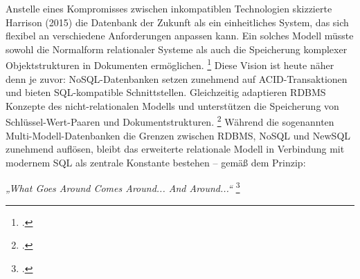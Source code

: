 Anstelle eines Kompromisses zwischen inkompatiblen Technologien skizzierte Harrison (2015) die Datenbank der Zukunft als ein einheitliches System, das sich flexibel an verschiedene Anforderungen anpassen kann. Ein solches Modell müsste sowohl die Normalform relationaler Systeme als auch die Speicherung komplexer Objektstrukturen in Dokumenten ermöglichen. \footcite[S. 195–202, S. 214]{harrisonNextGenerationDatabases2015} Diese Vision ist heute näher denn je zuvor: NoSQL-Datenbanken setzen zunehmend auf ACID-Transaktionen und bieten SQL-kompatible Schnittstellen. Gleichzeitig adaptieren RDBMS Konzepte des nicht-relationalen Modells und unterstützen die Speicherung von Schlüssel-Wert-Paaren und Dokumentstrukturen. \footcite[S. 22 ff.]{stonebrakerWhatGoesComes2024} Während die sogenannten Multi-Modell-Datenbanken die Grenzen zwischen RDBMS, NoSQL und NewSQL zunehmend auflösen, bleibt das erweiterte relationale Modell in Verbindung mit modernem SQL als zentrale Konstante bestehen – gemäß dem Prinzip: 

\begin{center}
    \textit{„What Goes Around Comes Around... And Around...“} \vspace{0.1cm}\footcite{stonebrakerWhatGoesComes2024}
\end{center}






